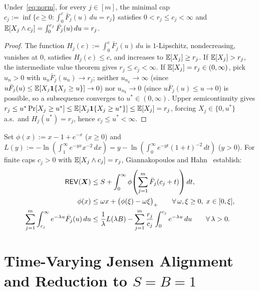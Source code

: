 \begin{lemma}\label{lem:finite-caps}
Under~\eqref{eq:norm}, for every $j \in [m]$, the minimal cap $c_j := \inf\{c \ge 0 : \int_0^c \bar{F}_j(u)\,du = r_j\}$ satisfies $0 < r_j \le c_j < \infty$ and $\mathbb{E}[X_j \wedge c_j] = \int_0^{c_j} \bar{F}_j(u)\,du = r_j$.
\end{lemma}

\begin{proof}
The function $H_j(c) := \int_0^c \bar{F}_j(u)\,du$ is $1$-Lipschitz, nondecreasing, vanishes at $0$, satisfies $H_j(c) \le c$, and increases to $\mathbb{E}[X_j] \ge r_j$. If $\mathbb{E}[X_j] > r_j$, the intermediate value theorem gives $r_j \le c_j < \infty$. If $\mathbb{E}[X_j] = r_j \in (0,\infty)$, pick $u_n > 0$ with $u_n\bar{F}_j(u_n) \to r_j$; neither $u_{n_k} \to \infty$ (since $u\bar{F}_j(u) \le \mathbb{E}[X_j\mathbf{1}\{X_j \ge u\}] \to 0$) nor $u_{n_k} \to 0$ (since $u\bar{F}_j(u) \le u \to 0$) is possible, so a subsequence converges to $u^* \in (0,\infty)$. Upper semicontinuity gives $r_j \le u^*\Pr[X_j \ge u^*] \le \mathbb{E}[X_j\mathbf{1}\{X_j \ge u^*\}] \le \mathbb{E}[X_j] = r_j$, forcing $X_j \in \{0, u^*\}$ a.s.\ and $H_j(u^*) = r_j$, hence $c_j \le u^* < \infty$.
\end{proof}

Set $\phi(x) := x - 1 + e^{-x}$ ($x \ge 0$) and $L(y) := -\ln(\int_1^\infty e^{-yx} x^{-2}\,dx) = y - \ln(\int_0^\infty e^{-yt}(1+t)^{-2}\,dt)$ ($y > 0$). For finite caps $c_j > 0$ with $\mathbb{E}[X_j \wedge c_j] = r_j$, Giannakopoulos and Hahn~\cite[Lemmas~4.4 and~4.5]{GiannakopoulosHahn26} establish:
\begin{align}
  \mathsf{REV}(\bm{X}) &\le S + \int_0^\infty \phi\!\left(\sum_{j=1}^m \bar{F}_j(c_j + t)\right) dt, \label{eq:gh27} \\
  \phi(x) &\le \omega x + \big(\phi(\xi) - \omega \xi\big)_+ \qquad \forall\,\omega,\xi \ge 0,\; x \in [0,\xi], \label{eq:gh28} \\
  \sum_{j=1}^m \int_{c_j}^\infty e^{-\lambda u}\bar{F}_j(u)\,du &\le \frac{1}{\lambda} L(\lambda B) - \sum_{j=1}^m \frac{r_j}{c_j}\int_0^{c_j} e^{-\lambda u}\,du \qquad \forall\,\lambda > 0. \label{eq:gh29}
\end{align}

\section{Time-Varying Jensen Alignment and Reduction to \texorpdfstring{$S = B = 1$}{S = B = 1}}\label{sec:ub-jensen}

